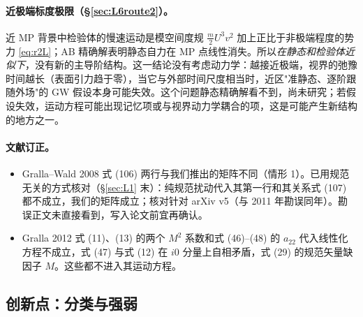 \documentclass[11pt,a4paper]{ctexart}
\numberwithin{equation}{section}
\begin{document}
\paragraph{近极端标度极限（\S\ref{sec:L6route2}）。}近 MP 背景中检验体的慢速运动是模空间度规 $\tfrac m2U^3v^2$ 加上正比于非极端程度的势力 \eqref{eq:r2L}；AB 精确解表明静态自力在 MP 点线性消失。所以\emph{在静态和检验体近似下}，没有新的主导阶结构。这一结论没有考虑动力学：越接近极端，视界的弛豫时间越长（表面引力趋于零），当它与外部时间尺度相当时，近区"准静态、逐阶跟随外场"的 GW 假设本身可能失效。这个问题静态精确解看不到，尚未研究；若假设失效，运动方程可能出现记忆项或与视界动力学耦合的项，这是可能产生新结构的地方之一。

\paragraph{文献订正。}
\begin{itemize}
\item Gralla--Wald 2008 式 (106) 两行与我们推出的矩阵不同（情形 1）。已用规范无关的方式核对（\S\ref{sec:L1} 末）：纯规范扰动代入其第一行和其关系式 (107) 都不成立，我们的矩阵成立；核对针对 arXiv v5（与 2011 年勘误同年）。勘误正文未直接看到，写入论文前宜再确认。
\item Gralla 2012 式 (11)、(13) 的两个 $M^2$ 系数和式 (46)--(48) 的 $a_{22}$ 代入线性化方程不成立，式 (47) 与式 (12) 在 $i0$ 分量上自相矛盾，式 (29) 的规范矢量缺因子 $M$。这些都不进入其运动方程。
\end{itemize}

\subsection{创新点：分类与强弱}
\end{document}
